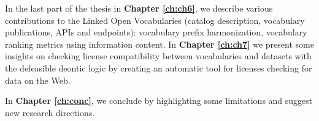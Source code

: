  In the last part of the thesis in \textbf{Chapter \ref{ch:ch6}}, we describe various contributions to the Linked Open Vocabularies (catalog description, vocabulary publications, APIs and endpoints): vocabulary prefix harmonization, vocabulary ranking metrics using information content. 
  In \textbf{Chapter \ref{ch:ch7}} we present some insights on checking license compatibility between vocabularies and datasets with the defeasible deontic logic by creating an automatic tool for licenses checking for data on the Web. 


 In \textbf{Chapter \ref{ch:conc}}, we conclude by highlighting some limitations and suggest new research directions.
 
 
 
